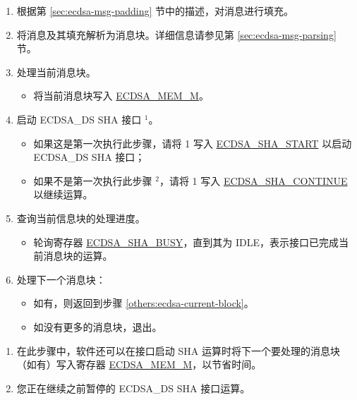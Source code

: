 \documentclass[main\_\_CN.tex]{subfiles}
\begin{document}
\begin{enumerate}
	\item 根据第 \ref{sec:ecdsa-msg-padding} 节中的描述，对消息进行填充。
	\item 将消息及其填充解析为消息块。详细信息请参见第 \ref{sec:ecdsa-msg-parsing} 节。
	\item \label{others:ecdsa-current-block} 处理当前消息块。
	      \begin{itemize}
		      \item 将当前消息块写入 \hyperref[tab:ecdsa-memory]{ECDSA\_MEM\_M}。
	      \end{itemize}
	\item 启动 ECDSA\_DS SHA 接口 \hyperref[others:ecdsa-note-sha]{$^1$}。
	      \begin{itemize}
		      \item 如果这是第一次执行此步骤，请将 1 写入 \hyperref[fielddesc:ECDSASHASTART]{ECDSA\_SHA\_START} 以启动 ECDSA\_DS SHA 接口；
		      \item 如果不是第一次执行此步骤 \hyperref[others:ecdsa-note-sha]{$^2$}，请将 1 写入 \hyperref[fielddesc:ECDSASHACONTINUE]{ECDSA\_SHA\_CONTINUE} 以继续运算。
	      \end{itemize}
	\item 查询当前信息块的处理进度。
	      \begin{itemize}
		      \item 轮询寄存器 \hyperref[fielddesc:ECDSASHABUSY]{ECDSA\_SHA\_BUSY}，直到其为 IDLE，表示接口已完成当前消息块的运算。
	      \end{itemize}

	\item 处理下一个消息块：
	      \begin{itemize}
		      \item 如有，则返回到步骤 \ref{others:ecdsa-current-block}。
		      \item 如没有更多的消息块，退出。
	      \end{itemize}

\end{enumerate}

\begin{tiplisting}\label{others:ecdsa-note-sha}
\vspace{-2.5em}
\begin{enumerate}
\item 在此步骤中，软件还可以在接口启动 SHA 运算时将下一个要处理的消息块（如有）写入寄存器 \hyperref[tab:ecdsa-memory]{ECDSA\_MEM\_M}，以节省时间。
\item 您正在继续之前暂停的 ECDSA\_DS SHA 接口运算。
\end{enumerate}
\end{tiplisting}
\end{document}

